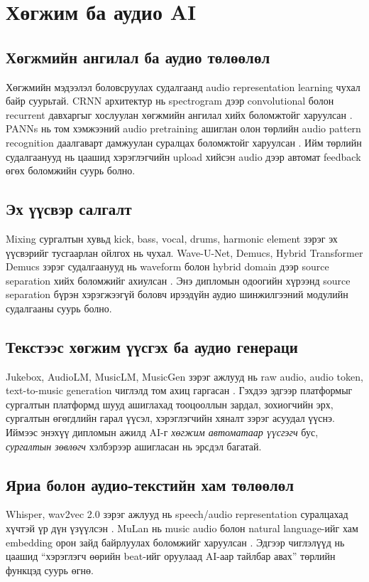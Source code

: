 \section{Хөгжим ба аудио AI}
\subsection{Хөгжмийн ангилал ба аудио төлөөлөл}
Хөгжмийн мэдээлэл боловсруулах судалгаанд audio representation learning чухал байр суурьтай. CRNN архитектур нь spectrogram дээр convolutional болон recurrent давхаргыг хослуулан хөгжмийн ангилал хийх боломжтойг харуулсан \cite{crnn_music_choi_2016}. PANNs нь том хэмжээний audio pretraining ашиглан олон төрлийн audio pattern recognition даалгаварт дамжуулан суралцах боломжтойг харуулсан \cite{panns_kong_2020}. Ийм төрлийн судалгаанууд нь цаашид хэрэглэгчийн upload хийсэн audio дээр автомат feedback өгөх боломжийн суурь болно.

\subsection{Эх үүсвэр салгалт}
Mixing сургалтын хувьд kick, bass, vocal, drums, harmonic element зэрэг эх үүсвэрийг тусгаарлан ойлгох нь чухал. Wave-U-Net, Demucs, Hybrid Transformer Demucs зэрэг судалгаанууд нь waveform болон hybrid domain дээр source separation хийх боломжийг ахиулсан \cite{waveunet_stoller_2018,demucs_defossez_2021,htdemucs_rouard_2022}. Энэ дипломын одоогийн хүрээнд source separation бүрэн хэрэгжээгүй боловч ирээдүйн аудио шинжилгээний модулийн судалгааны суурь болно.

\subsection{Текстээс хөгжим үүсгэх ба аудио генераци}
Jukebox, AudioLM, MusicLM, MusicGen зэрэг ажлууд нь raw audio, audio token, text-to-music generation чиглэлд том ахиц гаргасан \cite{jukebox_dhariwal_2020,audiolm_borsos_2022,musiclm_2023,musicgen_2023}. Гэхдээ эдгээр платформыг сургалтын платформд шууд ашиглахад тооцооллын зардал, зохиогчийн эрх, сургалтын өгөгдлийн гарал үүсэл, хэрэглэгчийн хяналт зэрэг асуудал үүснэ. Иймээс энэхүү дипломын ажилд AI-г \textit{хөгжим автоматаар үүсгэгч} бус, \textit{сургалтын зөвлөгч} хэлбэрээр ашигласан нь эрсдэл багатай.

\subsection{Яриа болон аудио-текстийн хам төлөөлөл}
Whisper, wav2vec 2.0 зэрэг ажлууд нь speech/audio representation суралцахад хүчтэй үр дүн үзүүлсэн \cite{whisper_radford_2022,wav2vec2_baevski_2020}. MuLan нь music audio болон natural language-ийг хам embedding орон зайд байрлуулах боломжийг харуулсан \cite{mulan_huang_2022}. Эдгээр чиглэлүүд нь цаашид “хэрэглэгч өөрийн beat-ийг оруулаад AI-аар тайлбар авах” төрлийн функцэд суурь өгнө.

